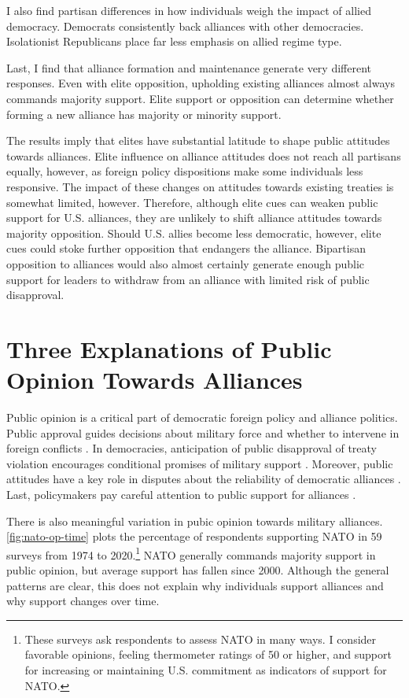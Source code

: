 \documentclass[12pt]{article}
\begin{document}
I also find partisan differences in how individuals weigh the impact of allied democracy. 
Democrats consistently back alliances with other democracies. 
Isolationist Republicans place far less emphasis on allied regime type. 


Last, I find that alliance formation and maintenance generate very different responses.
Even with elite opposition, upholding existing alliances almost always commands majority support. 
Elite support or opposition can determine whether forming a new alliance has majority or minority support. 


The results imply that elites have substantial latitude to shape public attitudes towards alliances. 
Elite influence on alliance attitudes does not reach all partisans equally, however, as foreign policy dispositions make some individuals less responsive. 
The impact of these changes on attitudes towards existing treaties is somewhat limited, however. 
Therefore, although elite cues can weaken public support for U.S. alliances, they are unlikely to shift alliance attitudes towards majority opposition. 
Should U.S. allies become less democratic, however, elite cues could stoke further opposition that endangers the alliance.
Bipartisan opposition to alliances would also almost certainly generate enough public support for leaders to withdraw from an alliance with limited risk of public disapproval.  




\section{Three Explanations of Public Opinion Towards Alliances}

Public opinion is a critical part of democratic foreign policy and alliance politics.
Public approval guides decisions about military force and whether to intervene in foreign conflicts \citep{Tomzetal2020, LinGreenberg2021}. 
In democracies, anticipation of public disapproval of treaty violation encourages conditional promises of military support \citep{Chibaetal2015, FjelstulReiter2019}. 
Moreover, public attitudes have a key role in disputes about the reliability of democratic alliances \citep{Gaubatz1996, GartzkeGleditsch2004}. 
Last, policymakers pay careful attention to public support for alliances \citep{Sayle2019}. 


There is also meaningful variation in pubic opinion towards military alliances. 
\autoref{fig:nato-op-time} plots the percentage of respondents supporting NATO in 59 surveys from 1974 to 2020.\footnote{These surveys ask respondents to assess NATO in many ways. I consider favorable opinions, feeling thermometer ratings of 50 or higher, and support for increasing or maintaining U.S. commitment as indicators of support for NATO.} 
NATO generally commands majority support in public opinion, but average support has fallen since 2000. 
Although the general patterns are clear, this does not explain why individuals support alliances and why support changes over time. 
\end{document}
